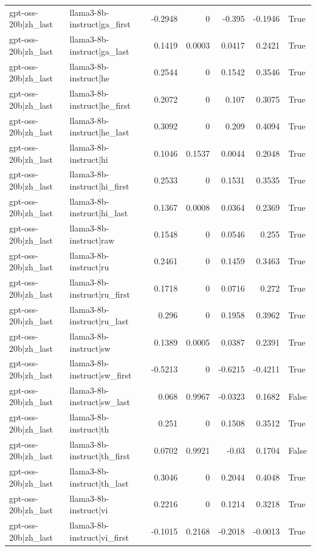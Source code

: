 \begin{table}
\begin{tabular}{l l r r r r l}
gpt-oss-20b|zh_last & llama3-8b-instruct|ga_first & -0.2948 & 0 & -0.395 & -0.1946 & True \\
gpt-oss-20b|zh_last & llama3-8b-instruct|ga_last & 0.1419 & 0.0003 & 0.0417 & 0.2421 & True \\
gpt-oss-20b|zh_last & llama3-8b-instruct|he & 0.2544 & 0 & 0.1542 & 0.3546 & True \\
gpt-oss-20b|zh_last & llama3-8b-instruct|he_first & 0.2072 & 0 & 0.107 & 0.3075 & True \\
gpt-oss-20b|zh_last & llama3-8b-instruct|he_last & 0.3092 & 0 & 0.209 & 0.4094 & True \\
gpt-oss-20b|zh_last & llama3-8b-instruct|hi & 0.1046 & 0.1537 & 0.0044 & 0.2048 & True \\
gpt-oss-20b|zh_last & llama3-8b-instruct|hi_first & 0.2533 & 0 & 0.1531 & 0.3535 & True \\
gpt-oss-20b|zh_last & llama3-8b-instruct|hi_last & 0.1367 & 0.0008 & 0.0364 & 0.2369 & True \\
gpt-oss-20b|zh_last & llama3-8b-instruct|raw & 0.1548 & 0 & 0.0546 & 0.255 & True \\
gpt-oss-20b|zh_last & llama3-8b-instruct|ru & 0.2461 & 0 & 0.1459 & 0.3463 & True \\
gpt-oss-20b|zh_last & llama3-8b-instruct|ru_first & 0.1718 & 0 & 0.0716 & 0.272 & True \\
gpt-oss-20b|zh_last & llama3-8b-instruct|ru_last & 0.296 & 0 & 0.1958 & 0.3962 & True \\
gpt-oss-20b|zh_last & llama3-8b-instruct|sw & 0.1389 & 0.0005 & 0.0387 & 0.2391 & True \\
gpt-oss-20b|zh_last & llama3-8b-instruct|sw_first & -0.5213 & 0 & -0.6215 & -0.4211 & True \\
gpt-oss-20b|zh_last & llama3-8b-instruct|sw_last & 0.068 & 0.9967 & -0.0323 & 0.1682 & False \\
gpt-oss-20b|zh_last & llama3-8b-instruct|th & 0.251 & 0 & 0.1508 & 0.3512 & True \\
gpt-oss-20b|zh_last & llama3-8b-instruct|th_first & 0.0702 & 0.9921 & -0.03 & 0.1704 & False \\
gpt-oss-20b|zh_last & llama3-8b-instruct|th_last & 0.3046 & 0 & 0.2044 & 0.4048 & True \\
gpt-oss-20b|zh_last & llama3-8b-instruct|vi & 0.2216 & 0 & 0.1214 & 0.3218 & True \\
gpt-oss-20b|zh_last & llama3-8b-instruct|vi_first & -0.1015 & 0.2168 & -0.2018 & -0.0013 & True \\

\end{tabular}
\end{table}
